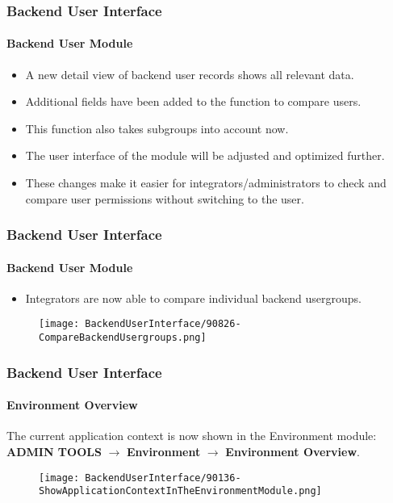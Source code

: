 
\begin{frame}[fragile]
	\frametitle{Backend User Interface}
	\framesubtitle{Backend User Module}

	\begin{itemize}
		\item A new detail view of backend user records shows all relevant data.
		\item Additional fields have been added to the function to compare users.
		\item This function also takes subgroups into account now.
		\item The user interface of the module will be adjusted and optimized further.
		\item These changes make it easier for integrators/administrators to check
			and compare user permissions without switching to the user.
	\end{itemize}

\end{frame}


\begin{frame}[fragile]
	\frametitle{Backend User Interface}
	\framesubtitle{Backend User Module}

	\begin{itemize}
		\item Integrators are now able to compare individual backend usergroups.
	\end{itemize}

	\begin{figure}
		\texttt{[image: BackendUserInterface/90826-CompareBackendUsergroups.png]}
	\end{figure}

\end{frame}


\begin{frame}[fragile]
	\frametitle{Backend User Interface}
	\framesubtitle{Environment Overview}

	The current application context is now shown in the Environment module:\newline
	\textbf{ADMIN TOOLS} $\rightarrow$ \textbf{Environment} $\rightarrow$ \textbf{Environment Overview}.

	\begin{figure}
		\texttt{[image: BackendUserInterface/90136-ShowApplicationContextInTheEnvironmentModule.png]}
	\end{figure}

\end{frame}

